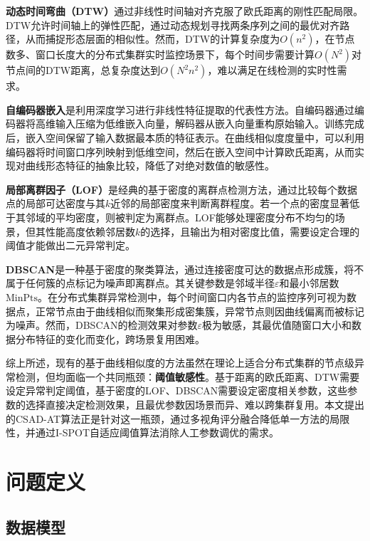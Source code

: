 \documentclass[10.5pt,a4paper,twocolumn]{ctexart}
\begin{document}
\textbf{动态时间弯曲（DTW）}\cite{berndt1994dtw}通过非线性时间轴对齐克服了欧氏距离的刚性匹配局限。DTW允许时间轴上的弹性匹配，通过动态规划寻找两条序列之间的最优对齐路径，从而捕捉形态层面的相似性。然而，DTW的计算复杂度为$O(n^2)$，在节点数多、窗口长度大的分布式集群实时监控场景下，每个时间步需要计算$O(N^2)$对节点间的DTW距离，总复杂度达到$O(N^2 n^2)$，难以满足在线检测的实时性需求。

\textbf{自编码器嵌入}是利用深度学习进行非线性特征提取的代表性方法。自编码器\cite{hinton2006autoencoder}通过编码器将高维输入压缩为低维嵌入向量，解码器从嵌入向量重构原始输入。训练完成后，嵌入空间保留了输入数据最本质的特征表示。在曲线相似度度量中，可以利用编码器将时间窗口序列映射到低维空间，然后在嵌入空间中计算欧氏距离，从而实现对曲线形态特征的抽象比较，降低了对绝对数值的敏感性。

\textbf{局部离群因子（LOF）}\cite{breunig2000lof}是经典的基于密度的离群点检测方法，通过比较每个数据点的局部可达密度与其$k$近邻的局部密度来判断离群程度。若一个点的密度显著低于其邻域的平均密度，则被判定为离群点。LOF能够处理密度分布不均匀的场景，但其性能高度依赖邻居数$k$的选择，且输出为相对密度比值，需要设定合理的阈值才能做出二元异常判定。

\textbf{DBSCAN}\cite{ester1996dbscan}是一种基于密度的聚类算法，通过连接密度可达的数据点形成簇，将不属于任何簇的点标记为噪声即离群点。其关键参数是邻域半径$\varepsilon$和最小邻居数$\text{MinPts}$。在分布式集群异常检测中，每个时间窗口内各节点的监控序列可视为数据点，正常节点由于曲线相似而聚集形成密集簇，异常节点则因曲线偏离而被标记为噪声。然而，DBSCAN的检测效果对参数$\varepsilon$极为敏感，其最优值随窗口大小和数据分布特征的变化而变化，跨场景复用困难。

综上所述，现有的基于曲线相似度的方法虽然在理论上适合分布式集群的节点级异常检测，但均面临一个共同瓶颈：\textbf{阈值敏感性}。基于距离的欧氏距离、DTW需要设定异常判定阈值，基于密度的LOF、DBSCAN需要设定密度相关参数，这些参数的选择直接决定检测效果，且最优参数因场景而异、难以跨集群复用。本文提出的CSAD-AT算法正是针对这一瓶颈，通过多视角评分融合降低单一方法的局限性，并通过I-SPOT自适应阈值算法消除人工参数调优的需求。


\section{问题定义}

\subsection{数据模型}
\end{document}
